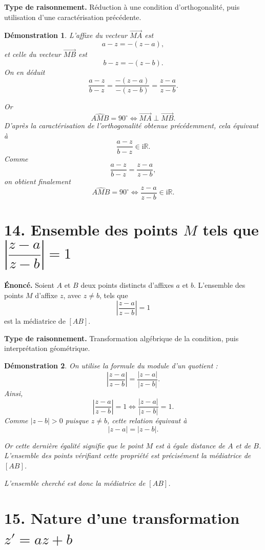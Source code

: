 \documentclass[11pt,a4paper]{article}
\newtheorem{prop}{Démonstration}
\newcommand{\R}{\mathbb{R}}
\newcommand{\ii}{\mathrm{i}}
\begin{document}
\textbf{Type de raisonnement.} Réduction à une condition d'orthogonalité, puis utilisation d'une caractérisation précédente.

\begin{prop}
L'affixe du vecteur $\overrightarrow{MA}$ est
\[
a-z=-(z-a),
\]
et celle du vecteur $\overrightarrow{MB}$ est
\[
b-z=-(z-b).
\]
On en déduit
\[
\frac{a-z}{b-z}=\frac{-(z-a)}{-(z-b)}=\frac{z-a}{z-b}.
\]

Or
\[
\widehat{AMB}=90^\circ
\iff
\overrightarrow{MA}\perp \overrightarrow{MB}.
\]
D'après la caractérisation de l'orthogonalité obtenue précédemment, cela équivaut à
\[
\frac{a-z}{b-z}\in \ii\R.
\]
Comme
\[
\frac{a-z}{b-z}=\frac{z-a}{z-b},
\]
on obtient finalement
\[
\widehat{AMB}=90^\circ
\iff
\frac{z-a}{z-b}\in \ii\R.
\]
\end{prop}

\section*{14. Ensemble des points \texorpdfstring{$M$}{M} tels que \texorpdfstring{$\left|\dfrac{z-a}{z-b}\right|=1$}{|(z-a)/(z-b)|=1}}

\textbf{Énoncé.} Soient $A$ et $B$ deux points distincts d'affixes $a$ et $b$. L'ensemble des points $M$ d'affixe $z$, avec $z\neq b$, tels que
\[
\left|\frac{z-a}{z-b}\right|=1
\]
est la médiatrice de $[AB]$.

\textbf{Type de raisonnement.} Transformation algébrique de la condition, puis interprétation géométrique.

\begin{prop}
On utilise la formule du module d'un quotient :
\[
\left|\frac{z-a}{z-b}\right|=\frac{|z-a|}{|z-b|}.
\]
Ainsi,
\[
\left|\frac{z-a}{z-b}\right|=1
\iff
\frac{|z-a|}{|z-b|}=1.
\]
Comme $|z-b|>0$ puisque $z\neq b$, cette relation équivaut à
\[
|z-a|=|z-b|.
\]

Or cette dernière égalité signifie que le point $M$ est à égale distance de $A$ et de $B$. L'ensemble des points vérifiant cette propriété est précisément la médiatrice de $[AB]$.

L'ensemble cherché est donc la médiatrice de $[AB]$.
\end{prop}

\section*{15. Nature d'une transformation \texorpdfstring{$z'=az+b$}{z'=az+b}}
\end{document}
